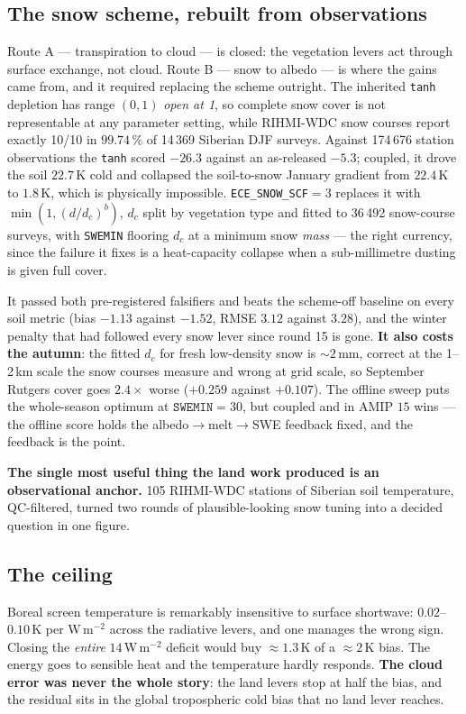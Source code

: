 \documentclass[10pt]{article}
\begin{document}
\subsection{The snow scheme, rebuilt from observations}
Route A --- transpiration to cloud --- is closed: the vegetation levers act through surface
exchange, not cloud. Route B --- snow to albedo --- is where the gains came from, and it
required replacing the scheme outright. The inherited \texttt{tanh} depletion has range
$(0,1)$ \emph{open at 1}, so complete snow cover is not representable at any parameter
setting, while RIHMI-WDC snow courses report exactly 10/10 in $99.74\,\%$ of 14\,369
Siberian DJF surveys. Against 174\,676 station observations the \texttt{tanh} scored $-26.3$
against an as-released $-5.3$; coupled, it drove the soil $\mathbf{22.7}$\,K cold and
collapsed the soil-to-snow January gradient from $22.4$\,K to $1.8$\,K, which is physically
impossible. \texttt{ECE\_SNOW\_SCF}$=3$ replaces it with $\min(1,(d/d_c)^b)$, $d_c$ split by
vegetation type and fitted to 36\,492 snow-course surveys, with \texttt{SWEMIN} flooring
$d_c$ at a minimum snow \emph{mass} --- the right currency, since the failure it fixes is a
heat-capacity collapse when a sub-millimetre dusting is given full cover.

It passed both pre-registered falsifiers and beats the scheme-off baseline on every soil
metric (bias $-1.13$ against $-1.52$, RMSE $3.12$ against $3.28$), and the winter penalty
that had followed every snow lever since round 15 is gone. \textbf{It also costs the
autumn}: the fitted $d_c$ for fresh low-density snow is ${\sim}2$\,mm, correct at the
1--2\,km scale the snow courses measure and wrong at grid scale, so September Rutgers cover
goes $2.4\times$ worse ($+0.259$ against $+0.107$). The offline sweep puts the whole-season
optimum at $\mathtt{SWEMIN}=30$, but coupled and in AMIP $15$ wins --- the offline score
holds the albedo$\to$melt$\to$SWE feedback fixed, and the feedback is the point.

\textbf{The single most useful thing the land work produced is an observational anchor.} 105
RIHMI-WDC stations of Siberian soil temperature, QC-filtered, turned two rounds of
plausible-looking snow tuning into a decided question in one figure.

\subsection{The ceiling}
Boreal screen temperature is remarkably insensitive to surface shortwave: $0.02$--$0.10$\,K
per W\,m$^{-2}$ across the radiative levers, and one manages the wrong sign. Closing the
\emph{entire} $14$\,W\,m$^{-2}$ deficit would buy ${\approx}1.3$\,K of a ${\approx}2$\,K
bias. The energy goes to sensible heat and the temperature hardly responds. \textbf{The
cloud error was never the whole story}: the land levers stop at half the bias, and the
residual sits in the global tropospheric cold bias that no land lever reaches.
\end{document}
